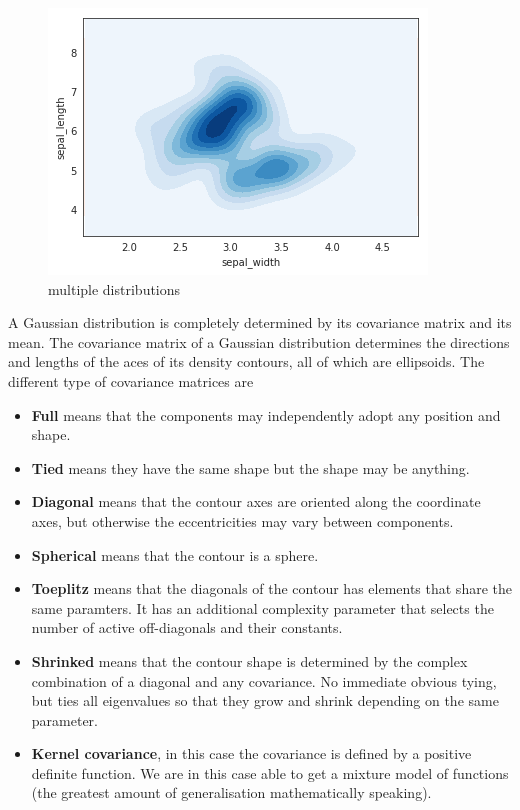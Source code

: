 \documentclass{book}
\begin{document}
\begin{figure}[htpb]
	\centering
	\includegraphics[width=0.8\linewidth]{multiple_contours.png}
	\caption{multiple distributions}
	\label{fig:multiple_distributions}
\end{figure}

A Gaussian distribution is completely determined by its covariance matrix and its mean. The covariance matrix of a Gaussian distribution determines the directions and lengths of the aces of its density contours, all of which are ellipsoids. The different type of covariance matrices are

\begin{itemize}
	\item \textbf{Full} means that the components may independently adopt any position and shape.
	\item \textbf{Tied} means they have the same shape but the shape may be anything.
	\item \textbf{Diagonal} means that the contour axes are oriented along the coordinate axes, but otherwise the eccentricities may vary between components.
	\item \textbf{Spherical} means that the contour is a sphere.
	\item \textbf{Toeplitz} means that the diagonals of the contour has elements that share the same paramters. It has an additional complexity parameter that selects the number of active off-diagonals and their constants.
	\item \textbf{Shrinked} means that the contour shape is determined by the complex combination of a diagonal and any covariance. No immediate obvious tying, but ties all eigenvalues so that they grow and shrink depending on the same parameter.
	\item \textbf{Kernel covariance}, in this case the covariance is defined by a positive definite function. We are in this case able to get a mixture model of functions (the greatest amount of generalisation mathematically speaking).
\end{itemize}
\end{document}
